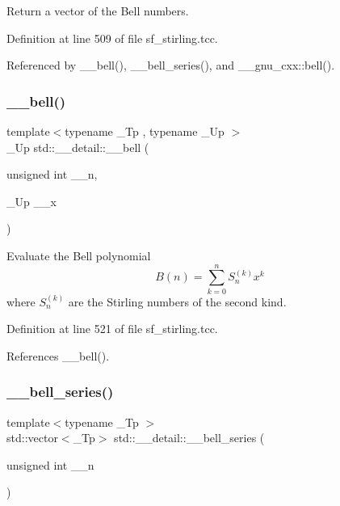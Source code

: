 Return a vector of the Bell numbers. 

Definition at line 509 of file sf\+\_\+stirling.\+tcc.



Referenced by \+\_\+\+\_\+bell(), \+\_\+\+\_\+bell\+\_\+series(), and \+\_\+\+\_\+gnu\+\_\+cxx\+::bell().

\mbox{\label{namespacestd_1_1____detail_a416c4b8a894dc8755484a8ad8740453a}} 
\subsubsection{\texorpdfstring{\+\_\+\+\_\+bell()}{\_\_bell()}\hspace{0.1cm}{\footnotesize\ttfamily [2/2]}}
{\footnotesize\ttfamily template$<$typename \+\_\+\+Tp , typename \+\_\+\+Up $>$ \\
\+\_\+\+Up std\+::\+\_\+\+\_\+detail\+::\+\_\+\+\_\+bell (\begin{DoxyParamCaption}\item[{unsigned int}]{\+\_\+\+\_\+n,  }\item[{\+\_\+\+Up}]{\+\_\+\+\_\+x }\end{DoxyParamCaption})\hspace{0.3cm}{\ttfamily [inline]}}

Evaluate the Bell polynomial \[ B(n) = \sum_{k=0}^{n}S_n^{(k)}x^k \] where $ S_n^{(k)} $ are the Stirling numbers of the second kind. 

Definition at line 521 of file sf\+\_\+stirling.\+tcc.



References \+\_\+\+\_\+bell().

\mbox{\label{namespacestd_1_1____detail_acab68a50669a465d6bddc7a54a649819}} 
\subsubsection{\texorpdfstring{\+\_\+\+\_\+bell\+\_\+series()}{\_\_bell\_series()}}
{\footnotesize\ttfamily template$<$typename \+\_\+\+Tp $>$ \\
std\+::vector$<$\+\_\+\+Tp$>$ std\+::\+\_\+\+\_\+detail\+::\+\_\+\+\_\+bell\+\_\+series (\begin{DoxyParamCaption}\item[{unsigned int}]{\+\_\+\+\_\+n }\end{DoxyParamCaption})}


